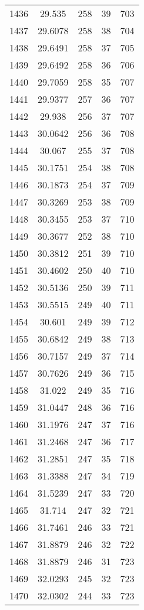 \documentclass[12pt,a4paper]{article}
\begin{document}
\begin{tabular}{r|cccc}
	1436 & 29.535 & 258 & 39 & 703 \\
	1437 & 29.6078 & 258 & 38 & 704 \\
	1438 & 29.6491 & 258 & 37 & 705 \\
	1439 & 29.6492 & 258 & 36 & 706 \\
	1440 & 29.7059 & 258 & 35 & 707 \\
	1441 & 29.9377 & 257 & 36 & 707 \\
	1442 & 29.938 & 256 & 37 & 707 \\
	1443 & 30.0642 & 256 & 36 & 708 \\
	1444 & 30.067 & 255 & 37 & 708 \\
	1445 & 30.1751 & 254 & 38 & 708 \\
	1446 & 30.1873 & 254 & 37 & 709 \\
	1447 & 30.3269 & 253 & 38 & 709 \\
	1448 & 30.3455 & 253 & 37 & 710 \\
	1449 & 30.3677 & 252 & 38 & 710 \\
	1450 & 30.3812 & 251 & 39 & 710 \\
	1451 & 30.4602 & 250 & 40 & 710 \\
	1452 & 30.5136 & 250 & 39 & 711 \\
	1453 & 30.5515 & 249 & 40 & 711 \\
	1454 & 30.601 & 249 & 39 & 712 \\
	1455 & 30.6842 & 249 & 38 & 713 \\
	1456 & 30.7157 & 249 & 37 & 714 \\
	1457 & 30.7626 & 249 & 36 & 715 \\
	1458 & 31.022 & 249 & 35 & 716 \\
	1459 & 31.0447 & 248 & 36 & 716 \\
	1460 & 31.1976 & 247 & 37 & 716 \\
	1461 & 31.2468 & 247 & 36 & 717 \\
	1462 & 31.2851 & 247 & 35 & 718 \\
	1463 & 31.3388 & 247 & 34 & 719 \\
	1464 & 31.5239 & 247 & 33 & 720 \\
	1465 & 31.714 & 247 & 32 & 721 \\
	1466 & 31.7461 & 246 & 33 & 721 \\
	1467 & 31.8879 & 246 & 32 & 722 \\
	1468 & 31.8879 & 246 & 31 & 723 \\
	1469 & 32.0293 & 245 & 32 & 723 \\
	1470 & 32.0302 & 244 & 33 & 723 \\

\end{tabular}
\end{document}
